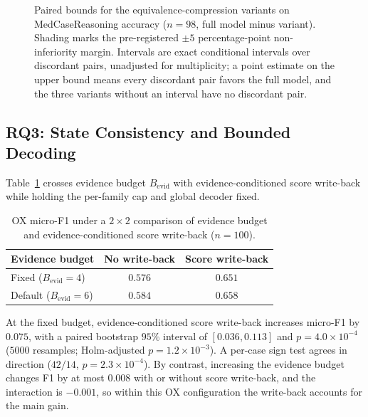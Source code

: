 \documentclass[letterpaper]{article} %
\begin{document}
\begin{figure}[t]
\caption{Paired bounds for the equivalence-compression variants on MedCaseReasoning accuracy ($n{=}98$, full model minus variant). Shading marks the pre-registered $\pm5$ percentage-point non-inferiority margin. Intervals are exact conditional intervals over discordant pairs, unadjusted for multiplicity; a point estimate on the upper bound means every discordant pair favors the full model, and the three variants without an interval have no discordant pair.}
\label{fig:bounds}
\end{figure}

\subsection{RQ3: State Consistency and Bounded Decoding}
\label{sec:res-state}

Table~\ref{tab:state-2x2} crosses evidence budget $B_{\mathrm{evid}}$ with evidence-conditioned score write-back while holding the per-family cap and global decoder fixed.

\begin{table}[t]
\centering
\small
\begin{tabular}{@{}lcc@{}}
\toprule
Evidence budget & No write-back & Score write-back \\
\midrule
Fixed ($B_{\mathrm{evid}}{=}4$) & $0.576$ & $\mathbf{0.651}$ \\
Default ($B_{\mathrm{evid}}{=}6$) & $0.584$ & $0.658$ \\
\bottomrule
\end{tabular}
\caption{OX micro-F1 under a $2{\times}2$ comparison of evidence budget and evidence-conditioned score write-back ($n{=}100$).}
\label{tab:state-2x2}

\end{table}

At the fixed budget, evidence-conditioned score write-back increases micro-F1 by $0.075$, with a paired bootstrap $95\%$ interval of $[0.036,0.113]$ and $p=4.0{\times}10^{-4}$ ($5000$ resamples; Holm-adjusted $p=1.2{\times}10^{-3}$).
A per-case sign test agrees in direction ($42/14$, $p=2.3{\times}10^{-4}$).
By contrast, increasing the evidence budget changes F1 by at most $0.008$ with or without score write-back, and the interaction is $-0.001$, so within this OX configuration the write-back accounts for the main gain.
\end{document}
